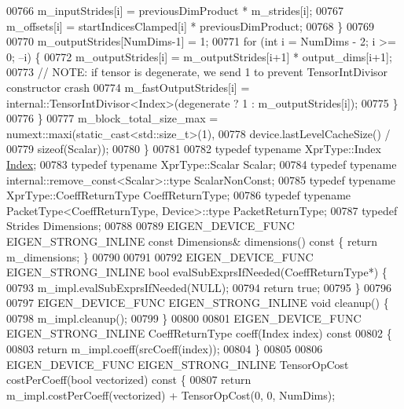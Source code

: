 \begin{DoxyCode}
00766         m\_inputStrides[i] = previousDimProduct * m\_strides[i];
00767         m\_offsets[i] = startIndicesClamped[i] * previousDimProduct;
00768       \}
00769 
00770       m\_outputStrides[NumDims-1] = 1;
00771       \textcolor{keywordflow}{for} (\textcolor{keywordtype}{int} i = NumDims - 2; i >= 0; --i) \{
00772         m\_outputStrides[i] = m\_outputStrides[i+1] * output\_dims[i+1];
00773         \textcolor{comment}{// NOTE: if tensor is degenerate, we send 1 to prevent TensorIntDivisor constructor crash}
00774         m\_fastOutputStrides[i] = internal::TensorIntDivisor<Index>(degenerate ? 1 : m\_outputStrides[i]);
00775       \}
00776     \}
00777     m\_block\_total\_size\_max = numext::maxi(static\_cast<std::size\_t>(1),
00778                                           device.lastLevelCacheSize() /
00779                                           \textcolor{keyword}{sizeof}(Scalar));
00780   \}
00781 
00782   \textcolor{keyword}{typedef} \textcolor{keyword}{typename} XprType::Index \hyperlink{namespace_eigen_a62e77e0933482dafde8fe197d9a2cfde}{Index};
00783   \textcolor{keyword}{typedef} \textcolor{keyword}{typename} XprType::Scalar Scalar;
00784   \textcolor{keyword}{typedef} \textcolor{keyword}{typename} internal::remove\_const<Scalar>::type ScalarNonConst;
00785   \textcolor{keyword}{typedef} \textcolor{keyword}{typename} XprType::CoeffReturnType CoeffReturnType;
00786   \textcolor{keyword}{typedef} \textcolor{keyword}{typename} PacketType<CoeffReturnType, Device>::type PacketReturnType;
00787   \textcolor{keyword}{typedef} Strides Dimensions;
00788 
00789   EIGEN\_DEVICE\_FUNC EIGEN\_STRONG\_INLINE \textcolor{keyword}{const} Dimensions& dimensions()\textcolor{keyword}{ const }\{ \textcolor{keywordflow}{return} m\_dimensions; \}
00790 
00791 
00792   EIGEN\_DEVICE\_FUNC EIGEN\_STRONG\_INLINE \textcolor{keywordtype}{bool} evalSubExprsIfNeeded(CoeffReturnType*) \{
00793     m\_impl.evalSubExprsIfNeeded(NULL);
00794     \textcolor{keywordflow}{return} \textcolor{keyword}{true};
00795   \}
00796 
00797   EIGEN\_DEVICE\_FUNC EIGEN\_STRONG\_INLINE \textcolor{keywordtype}{void} cleanup() \{
00798     m\_impl.cleanup();
00799   \}
00800 
00801   EIGEN\_DEVICE\_FUNC EIGEN\_STRONG\_INLINE CoeffReturnType coeff(Index index)\textcolor{keyword}{ const}
00802 \textcolor{keyword}{  }\{
00803     \textcolor{keywordflow}{return} m\_impl.coeff(srcCoeff(index));
00804   \}
00805 
00806   EIGEN\_DEVICE\_FUNC EIGEN\_STRONG\_INLINE TensorOpCost costPerCoeff(\textcolor{keywordtype}{bool} vectorized)\textcolor{keyword}{ const }\{
00807     \textcolor{keywordflow}{return} m\_impl.costPerCoeff(vectorized) + TensorOpCost(0, 0, NumDims);

\end{DoxyCode}

